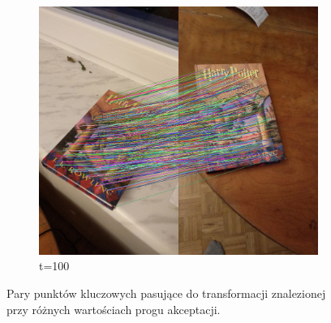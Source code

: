 \documentclass{article}
\begin{document}
\begin{figure}[H]
\begin{subfigure}[b]{0.4\linewidth}
			\includegraphics[width=\linewidth]{p100m.png}
			\caption{t=100}
		\end{subfigure}
		\caption{Pary punktów kluczowych pasujące do transformacji znalezionej przy różnych wartościach progu akceptacji.}
		\label{fig:thresh}
	\end{figure}
\end{document}
